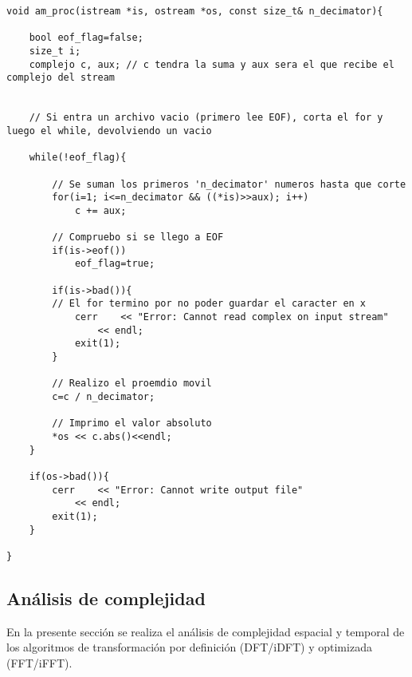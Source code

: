 \lstset{language=C++}
\begin{lstlisting}[frame=single]
void am_proc(istream *is, ostream *os, const size_t& n_decimator){
	
	bool eof_flag=false;
	size_t i;
	complejo c, aux; // c tendra la suma y aux sera el que recibe el complejo del stream	


	// Si entra un archivo vacio (primero lee EOF), corta el for y luego el while, devolviendo un vacio

	while(!eof_flag){
		
		// Se suman los primeros 'n_decimator' numeros hasta que corte 
		for(i=1; i<=n_decimator && ((*is)>>aux); i++)
			c += aux;
	
		// Compruebo si se llego a EOF
		if(is->eof())
			eof_flag=true;

		if(is->bad()){ 
		// El for termino por no poder guardar el caracter en x
			cerr	<< "Error: Cannot read complex on input stream"
				<< endl;
			exit(1);
		}		

		// Realizo el proemdio movil
		c=c / n_decimator;
			
		// Imprimo el valor absoluto
		*os << c.abs()<<endl;
	}
	
	if(os->bad()){
		cerr	<< "Error: Cannot write output file"
			<< endl;
		exit(1);
	}

}
\end{lstlisting}



\subsection{Análisis de complejidad}

	En la presente sección se realiza el análisis de complejidad espacial y temporal de los algoritmos de transformación por definición (DFT/iDFT) y optimizada (FFT/iFFT).

